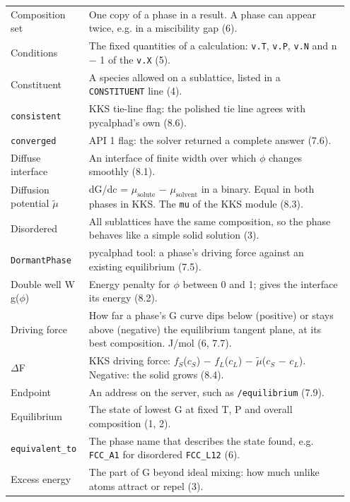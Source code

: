 \documentclass[12pt,a4paper]{article}
\begin{document}
\begin{longtable}{>{\raggedright\arraybackslash}p{0.202\linewidth}>{\raggedright\arraybackslash}p{0.745\linewidth}}
Composition set & One copy of a phase in a result. A phase can appear twice, e.g. in a miscibility gap (6). \\
Conditions & The fixed quantities of a calculation: \texttt{v.\allowbreak{}T}, \texttt{v.\allowbreak{}P}, \texttt{v.\allowbreak{}N} and n \(-\) 1 of the \texttt{v.\allowbreak{}X} (5). \\
Constituent & A species allowed on a sublattice, listed in a \texttt{CONSTITUENT} line (4). \\
\texttt{consistent} & KKS tie-line flag: the polished tie line agrees with pycalphad's own (8.6). \\
\texttt{converged} & API 1 flag: the solver returned a complete answer (7.6). \\
Diffuse interface & An interface of finite width over which \(\phi\) changes smoothly (8.1). \\
Diffusion potential \(\tilde{\mu}\) & dG/dc = \(\mu_{\mathrm{solute}}\) \(-\) \(\mu_{\mathrm{solvent}}\) in a binary. Equal in both phases in KKS. The \texttt{mu} of the KKS module (8.3). \\
Disordered & All sublattices have the same composition, so the phase behaves like a simple solid solution (3). \\
\texttt{DormantPhase} & pycalphad tool: a phase's driving force against an existing equilibrium (7.5). \\
Double well W g(\(\phi\)) & Energy penalty for \(\phi\) between 0 and 1; gives the interface its energy (8.2). \\
Driving force & How far a phase's G curve dips below (positive) or stays above (negative) the equilibrium tangent plane, at its best composition. J/mol (6, 7.7). \\
\(\Delta\)F & KKS driving force: \(f_{S}\)(\(c_{S}\)) \(-\) \(f_{L}\)(\(c_{L}\)) \(-\) \(\tilde{\mu}\)(\(c_{S}\) \(-\) \(c_{L}\)). Negative: the solid grows (8.4). \\
Endpoint & An address on the server, such as \texttt{/\allowbreak{}equilibrium} (7.9). \\
Equilibrium & The state of lowest G at fixed T, P and overall composition (1, 2). \\
\texttt{equivalent\_\allowbreak{}to} & The phase name that describes the state found, e.g. \texttt{FCC\_\allowbreak{}A1} for disordered \texttt{FCC\_\allowbreak{}L12} (6). \\
Excess energy & The part of G beyond ideal mixing: how much unlike atoms attract or repel (3). \\

\end{longtable}
\end{document}
